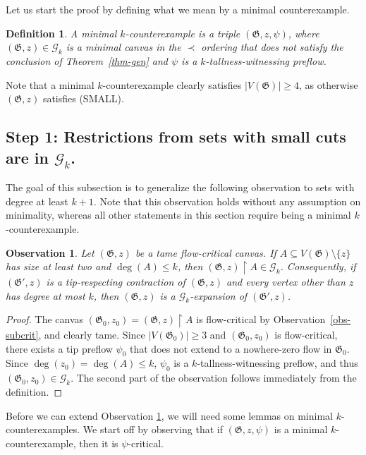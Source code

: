 \documentclass{article}
\newcommand{\GG}{\mathcal{G}}
\newcommand\g{\mathfrak{G}}
\newtheorem{observation}[theorem]{Observation}
\newtheorem{definition}[theorem]{Definition}
\begin{document}
Let us start the proof by defining what we mean by a minimal counterexample. 

\begin{definition}
A \emph{minimal $k$-counterexample} is a triple $(\g,z,\psi)$, where $(\g,z)\in\GG_k$ is a minimal canvas in the $\prec$ ordering that does not
satisfy the conclusion of Theorem~\ref{thm-gen} and $\psi$ is a $k$-tallness-witnessing preflow.
\end{definition}

Note that a minimal $k$-counterexample clearly satisfies $|V(\g)|\ge 4$, as otherwise $(\g,z)$ satisfies (SMALL).


\subsection{Step 1: Restrictions from sets with small cuts are in $\GG_{k}$.}

The goal of this subsection is to generalize the following observation to sets with degree at least $k+1$. Note that this observation holds without any assumption on minimality, whereas all other statements in this section require being a minimal $k$-counterexample. 

\begin{observation}\label{obs-inGk}
Let $(\g,z)$ be a tame flow-critical canvas.  If $A\subseteq V(\g)\setminus \{z\}$ has size at least two
and $\deg(A)\le k$, then $(\g,z)\restriction A\in\GG_k$.  Consequently, if $(\g',z)$ is a tip-respecting
contraction of $(\g,z)$ and every vertex other than $z$ has degree at most $k$, then $(\g,z)$ is a $\GG_k$-expansion of $(\g',z)$.
\end{observation}
\begin{proof}
The canvas $(\g_0,z_0)=(\g,z)\restriction A$ is flow-critical by Observation~\ref{obs-subcrit}, and clearly tame.
Since $|V(\g_0)|\ge 3$ and $(\g_0,z_0)$ is flow-critical, there exists a tip preflow $\psi_0$ that does not extend to a nowhere-zero flow in $\g_0$.
Since $\deg(z_0)=\deg(A)\le k$, $\psi_0$ is a $k$-tallness-witnessing preflow, and thus $(\g_0,z_0)\in \GG_k$. The second part of the observation follows immediately from the definition.
\end{proof}

Before we can extend Observation \ref{obs-inGk}, we will need some lemmas on minimal $k$-counterexam\-ples. We start off by observing that if $(\g,z,\psi)$ is a minimal $k$-counterexample, then it is $\psi$-critical.
\end{document}
